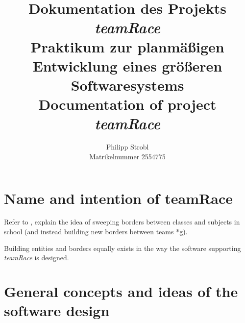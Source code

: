 \documentclass[11pt]{article}
\title{Dokumentation des Projekts 
\\\emph{teamRace}\bigskip\\
\large Praktikum zur planmäßigen Entwicklung eines größeren Softwaresystems\bigskip\\
\textbf{Documentation of project}
\\\emph{teamRace}}
\author{Philipp Strobl\\Matrikelnummer 2554775}
\date{}
\begin{document}
\maketitle

\section{Name and intention of teamRace}
Refer to \cite{teamrace}, explain the idea of sweeping borders between classes and subjects in school (and instead building new borders between teams *g).

Building entities and borders equally exists in the way the software supporting \emph{teamRace} is designed.
\section{General concepts and ideas of the software design}
\end{document}
